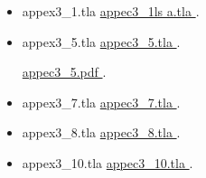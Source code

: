 \documentclass[ 12pt]{article}
\begin{document}
\begin{itemize}

  \item[]   appex3\_1.tla 
    \href{http://mery54.github.io/teaching/mvsi/models/appex3_1.tla}{
      appec3\_1ls a.tla }.

    
  \item[]   appex3\_5.tla 
    \href{http://mery54.github.io/teaching/mvsi/models/appex3_5.tla}{
      appec3\_5.tla }.

       \href{http://mery54.github.io/teaching/mvsi/models/appex3_5.pdf}{
      appec3\_5.pdf }.

      \item[]   appex3\_7.tla 
        \href{http://mery54.github.io/teaching/mvsi/models/appex3_7.tla}{
          appec3\_7.tla }.

              \item[]   appex3\_8.tla 
        \href{http://mery54.github.io/teaching/mvsi/models/appex3_8.tla}{
          appec3\_8.tla }.

              \item[]   appex3\_10.tla 
        \href{http://mery54.github.io/teaching/mvsi/models/appex3_10.tla}{
          appec3\_10.tla }.
        
   \end{itemize}




\end{document}
